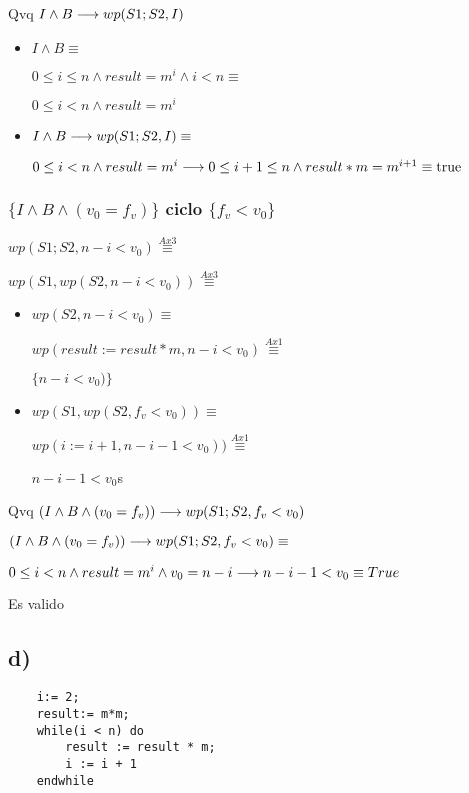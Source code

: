 \documentclass{article}
\begin{document}
Qvq $I \wedge B \longrightarrow wp(S1;S2, I)$

\begin{itemize}
    \item $I \wedge B \equiv$
    
    $0 \leq i \leq n \wedge result = m^{i} \wedge i < n \equiv$

    $0 \leq i < n \wedge result = m^{i}$

    \item $I \wedge B \longrightarrow wp(S1;S2, I) \equiv$

    $0 \leq i < n \wedge result = m^{i} \longrightarrow 0 \leq i+1 \leq n \wedge result*m = m^{i+1} \equiv \mathrm{true}$
\end{itemize}
    
\subsubsection*{$\{I \wedge B \wedge (v_{0} = f_{v})\}$ ciclo $\{f_{v} < v_{0}\}$}

$wp(S1;S2, n-i<v_{0}) \stackrel{Ax3}{\equiv}$

$wp(S1, wp(S2, n-i<v_{0})) \stackrel{Ax3}{\equiv}$

\begin{itemize}
    \item $wp(S2, n-i<v_{0}) \equiv$
    
    $ wp(result:=result * m, n-i<v_{0}) \stackrel{Ax1}{\equiv}$

    $ \{ n-i<v_{0}) \}$

    \item $wp(S1, wp(S2, f_{v} < v_{0})) \equiv$

    $ wp(i:= i + 1, n-i-1<v_{0})) \stackrel{Ax1}{\equiv}$

    $ n-i-1<v_{0} $s
\end{itemize}

Qvq $(I \wedge B \wedge (v_{0} = f_{v})) \longrightarrow wp(S1;S2, f_{v} < v_{0})$

$(I \wedge B \wedge (v_{0} = f_{v})) \longrightarrow wp(S1;S2, f_{v} < v_{0}) \equiv$

$0 \leq i < n \wedge result = m^{i} \wedge v_{0} = n-i \longrightarrow n-i-1<v_{0} \equiv True$

Es valido

\subsection*{d)}

\begin{verbatim}
    i:= 2;
    result:= m*m;
    while(i < n) do
        result := result * m;
        i := i + 1
    endwhile
\end{verbatim}
\end{document}
